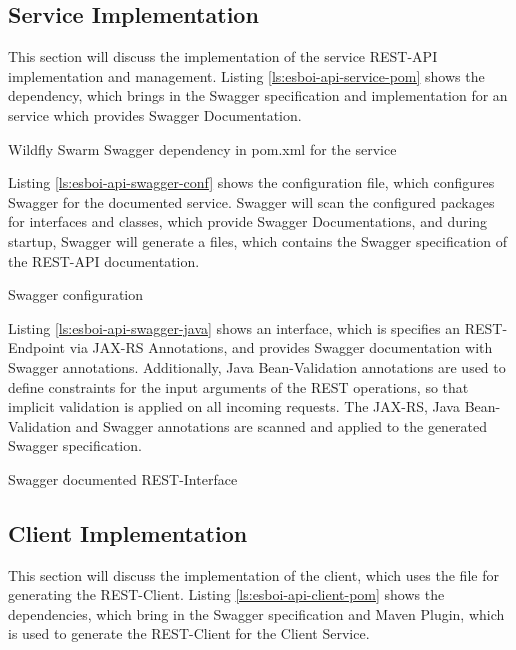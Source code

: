 \subsection{Service Implementation}
\label{sec:esbi-api-service}
This section will discuss the implementation of the service REST-API implementation and management. Listing \vref{ls:esboi-api-service-pom} shows the dependency, which brings in the Swagger specification and implementation for an service which provides Swagger Documentation.

\begin{listing}
	\caption{Wildfly Swarm Swagger dependency in pom.xml for the service}
	\label{ls:esboi-api-service-pom}
\end{listing}
 
Listing \vref{ls:esboi-api-swagger-conf} shows the  configuration file, which configures Swagger for the documented service. Swagger will scan the configured packages for interfaces and classes, which provide Swagger Documentations, and during startup, Swagger will generate a  files, which contains the Swagger specification of the REST-API documentation.   

\begin{listing}
	\caption{Swagger configuration}
	\label{ls:esboi-api-swagger-conf}
\end{listing}

Listing \vref{ls:esboi-api-swagger-java} shows an interface, which is specifies an REST-Endpoint via JAX-RS Annotations, and provides Swagger documentation with Swagger annotations. Additionally, Java Bean-Validation annotations are used to define constraints for the input arguments of the REST operations, so that implicit validation is applied on all incoming requests. The JAX-RS, Java Bean-Validation and Swagger annotations are scanned and applied to the generated Swagger specification.

\begin{listing}
	\caption{Swagger documented REST-Interface}
	\label{ls:esboi-api-swagger-java}
\end{listing} 

\subsection{Client Implementation}
\label{sec:esbi-api-client}
This section will discuss the implementation of the client, which uses the  file for generating the REST-Client. Listing \vref{ls:esboi-api-client-pom} shows the dependencies, which bring in the Swagger specification and Maven Plugin, which is used to generate the REST-Client for the Client Service.


